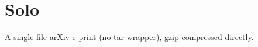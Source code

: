 \documentclass{article}
\begin{document}
\section{Solo}
A single-file arXiv e-print (no tar wrapper), gzip-compressed directly.
\end{document}
